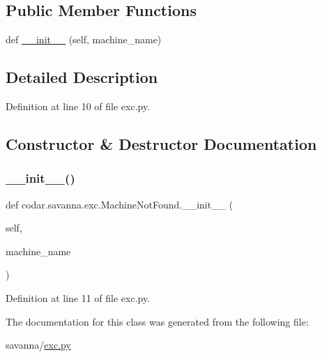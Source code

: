 \subsection*{Public Member Functions}
\begin{DoxyCompactItemize}
\item 
def \hyperlink{classcodar_1_1savanna_1_1exc_1_1_machine_not_found_aac59d9a2636166df83d3260fb7bc8933}{\+\_\+\+\_\+init\+\_\+\+\_\+} (self, machine\+\_\+name)
\end{DoxyCompactItemize}


\subsection{Detailed Description}


Definition at line 10 of file exc.\+py.



\subsection{Constructor \& Destructor Documentation}
\mbox{\label{classcodar_1_1savanna_1_1exc_1_1_machine_not_found_aac59d9a2636166df83d3260fb7bc8933}} 
\subsubsection{\texorpdfstring{\+\_\+\+\_\+init\+\_\+\+\_\+()}{\_\_init\_\_()}}
{\footnotesize\ttfamily def codar.\+savanna.\+exc.\+Machine\+Not\+Found.\+\_\+\+\_\+init\+\_\+\+\_\+ (\begin{DoxyParamCaption}\item[{}]{self,  }\item[{}]{machine\+\_\+name }\end{DoxyParamCaption})}



Definition at line 11 of file exc.\+py.



The documentation for this class was generated from the following file\+:\begin{DoxyCompactItemize}
\item 
savanna/\hyperlink{savanna_2exc_8py}{exc.\+py}\end{DoxyCompactItemize}
